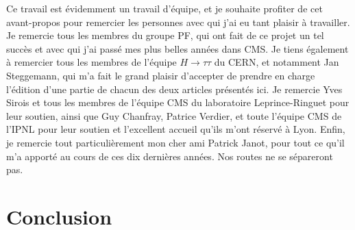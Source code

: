 \documentclass[11pt,twoside,a4paper,tdr]{cms-tdr}
\begin{document}
Ce travail est évidemment un travail d'équipe, et je souhaite profiter de cet avant-propos pour remercier les personnes avec qui j'ai eu tant plaisir à travailler.  
Je remercie tous les membres du groupe PF, qui ont fait de ce projet un tel succès et avec qui j'ai passé mes plus belles années dans CMS.  
Je tiens également à remercier tous les membres de l'équipe $H \to \tau \tau$ du CERN, et notamment Jan Steggemann, qui m'a fait le grand plaisir d'accepter de prendre en charge l'édition d'une partie de chacun des deux articles présentés ici.  
Je remercie Yves Sirois et tous les membres de l'équipe CMS du laboratoire Leprince-Ringuet pour leur soutien, 
ainsi que Guy Chanfray, Patrice Verdier, et toute l'équipe CMS de l'IPNL pour leur soutien et l'excellent accueil qu'ils m'ont réservé à Lyon. 
Enfin, je remercie tout particulièrement mon cher ami Patrick Janot, pour tout ce qu'il m'a apporté au cours de ces dix dernières années. Nos routes ne se sépareront pas. 

\newpage 

\section*{Conclusion} 
\end{document}
